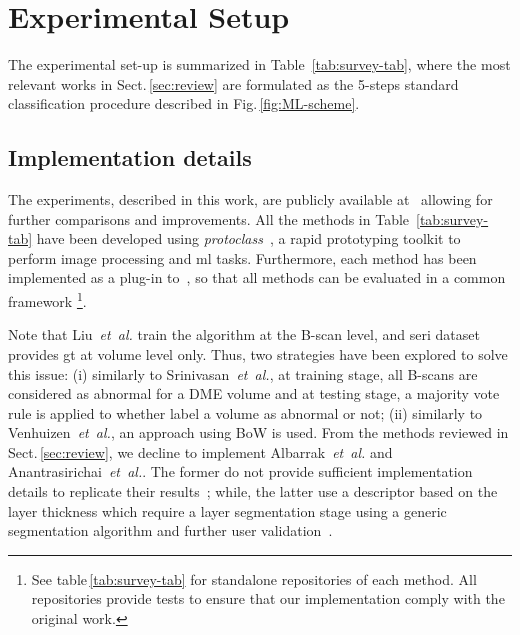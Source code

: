 \graphicspath{ {./content/method/figures/} }

\section{Experimental Setup}\label{sec:exp}

The experimental set-up is summarized in Table~\ref{tab:survey-tab}, where the most relevant works in Sect.\,\ref{sec:review} are formulated as the 5-steps standard classification procedure described in Fig.\,\ref{fig:ML-scheme}.

\subsection{Implementation details}\label{sec:exp:implementation}
The experiments, described in this work, are publicly available at~\cite{rethinopaty20016apr-repoICPR} allowing for further comparisons and improvements.
All the methods in Table~\ref{tab:survey-tab} have been developed using \emph{protoclass}~\cite{protoclass2016apr-repoICPR}, a rapid prototyping toolkit to perform image processing and \gls{ml} tasks.
Furthermore, each method has been implemented as a plug-in to~\cite{rethinopaty20016apr-repoICPR}, so that all methods can be evaluated in a common framework
\footnote{See table\,\ref{tab:survey-tab} for standalone repositories of each method. All repositories provide tests to ensure that our implementation comply with the original work.}.

Note that Liu~\emph{et~al.} train the algorithm at the B-scan level, and \gls{seri} dataset provides \gls{gt} at volume level only.
Thus, two strategies have been explored to solve this issue:
(i) similarly to Srinivasan~\emph{et~al.}, at training stage, all B-scans are considered as abnormal for a DME volume and at testing stage, a majority vote rule is applied to whether label a volume as abnormal or not;
(ii) similarly to Venhuizen~\emph{et~al.}, an approach using BoW is used.
From the methods reviewed in Sect.\,\ref{sec:review}, we decline to implement Albarrak~\emph{et~al.} and Anantrasirichai~\textit{et~al.}.
The former do not provide sufficient implementation details to replicate their results~\cite{albarrak2013age};
while, the latter use a descriptor based on the layer thickness which require a layer segmentation stage using a generic segmentation algorithm and further user validation~\cite{anantrasirichai2013svm}.


